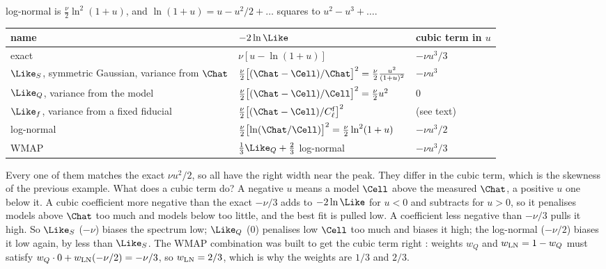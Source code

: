 log-normal is $\frac\nu2\ln^2(1+u)$, and $\ln(1+u)=u-u^2/2+\dots$ squares to $u^2-u^3+\dots$.
\begin{center}
\small
\renewcommand{\arraystretch}{1.2}
\begin{tabular}{@{}lll@{}}
\toprule
name & $-2\ln\Like$ & cubic term in $u$\\\midrule
exact & $\nu[u-\ln(1+u)]$ & $-\nu u^3/3$\\
$\Like_S$, symmetric Gaussian, variance from $\Chat$ & $\frac\nu2\bigl[(\Chat-\Cell)/\Chat\bigr]^2=\frac\nu2\frac{u^2}{(1+u)^2}$ & $-\nu u^3$\\
$\Like_Q$, variance from the model & $\frac\nu2\bigl[(\Chat-\Cell)/\Cell\bigr]^2=\frac\nu2u^2$ & $0$\\
$\Like_f$, variance from a fixed fiducial & $\frac\nu2\bigl[(\Chat-\Cell)/C^{\rm f}_\ell\bigr]^2$ & (see text)\\
log-normal & $\frac\nu2\bigl[\ln(\Chat/\Cell)\bigr]^2=\frac\nu2\ln^2(1+u)$ & $-\nu u^3/2$\\
WMAP & $\frac13\Like_Q+\frac23$ log-normal & $-\nu u^3/3$\\
\bottomrule
\end{tabular}
\end{center}
Every one of them matches the exact $\nu u^2/2$, so all have the right width near the peak. They differ in the
cubic term, which is the skewness of the previous example. What does a cubic term do? A negative $u$ means a
model $\Cell$ above the measured $\Chat$, a positive $u$ one below it. A cubic coefficient more negative than the
exact $-\nu/3$ adds to $-2\ln\Like$ for $u<0$ and subtracts for $u>0$, so it penalises models above $\Chat$ too
much and models below too little, and the best fit is pulled low. A coefficient less negative than $-\nu/3$ pulls
it high. So $\Like_S$ ($-\nu$) biases the spectrum low; $\Like_Q$ ($0$) penalises low $\Cell$ too much and biases it
high; the log-normal ($-\nu/2$) biases it low again, by less than $\Like_S$. The WMAP combination was built to get the
cubic term right \cite{Verde2003}: weights $w_Q$ and $w_{\rm LN}=1-w_Q$ must satisfy
$w_Q\cdot0+w_{\rm LN}(-\nu/2)=-\nu/3$, so $w_{\rm LN}=2/3$, which is why the weights are $1/3$ and $2/3$.


